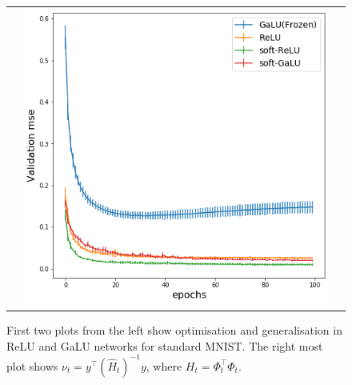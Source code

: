 \begin{figure}
{\begin{tabular}{ccc}
&
\includegraphics[scale=0.1]{figs/allnet-gen.png}
\end{tabular}
}
\caption{First two plots from the left show optimisation and generalisation in ReLU and GaLU networks for standard MNIST. The right most plot shows $\nu_t=y^\top (\widehat{H}_t)^{-1}y$, where $H_t=\Phi_t^\top \Phi_t$.}
\label{fig:gen}
\end{figure}

